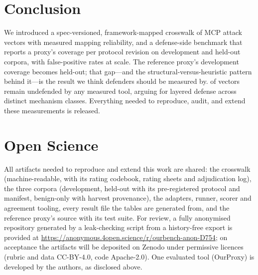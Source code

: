 \documentclass[conference]{IEEEtran}
\newcommand{\proxy}{OurProxy}
\begin{document}
\section{Conclusion}
We introduced a spec-versioned, framework-mapped crosswalk of \nVectors{} MCP attack vectors with measured mapping reliability, and a defense-side benchmark that reports a proxy's coverage per protocol revision on development and held-out corpora, with false-positive rates at scale. The reference proxy's \bastDevOrig{} development coverage becomes \bastHeldout{} held-out; that gap---and the structural-versus-heuristic pattern behind it---is the result we think defenders should be measured by. \nCoveredNone{} of \nVectors{} vectors remain undefended by any measured tool, arguing for layered defense across distinct mechanism classes. Everything needed to reproduce, audit, and extend these measurements is released.

\section*{Open Science}
All artifacts needed to reproduce and extend this work are shared: the crosswalk (machine-readable, with its rating codebook, rating sheets and adjudication log), the three corpora (development, held-out with its pre-registered protocol and manifest, benign-only with harvest provenance), the adapters, runner, scorer and agreement tooling, every result file the tables are generated from, and the reference proxy's source with its test suite. For review, a fully anonymised repository generated by a leak-checking script from a history-free export is provided at \url{https://anonymous.4open.science/r/ourbench-anon-D754}; on acceptance the artifacts will be deposited on Zenodo under permissive licences (rubric and data CC-BY-4.0, code Apache-2.0). One evaluated tool (\proxy) is developed by the authors, as disclosed above.
\end{document}

